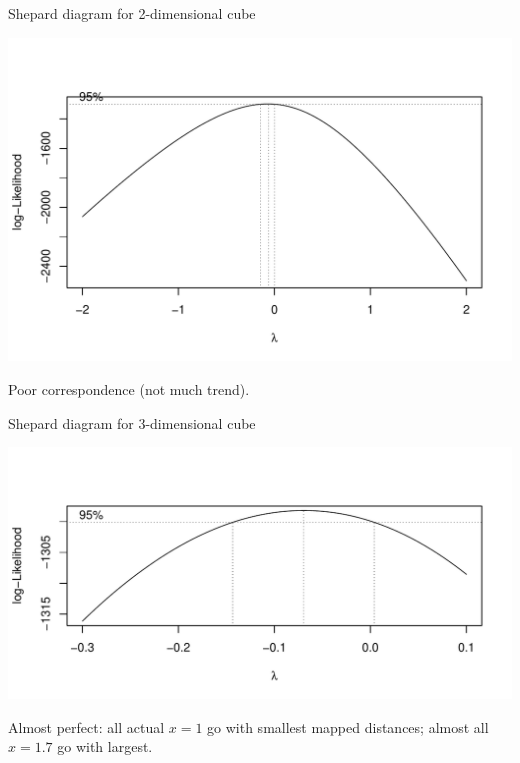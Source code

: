 \begin{frame}[fragile]{Shepard diagram for 2-dimensional cube}

\begin{knitrout}
\color{fgcolor}\begin{kframe}
\begin{alltt}
\end{alltt}
\end{kframe}
\includegraphics[width=\maxwidth]{figure/unnamed-chunk-38-1} 

\end{knitrout}

Poor correspondence (not much trend).
\end{frame}

\begin{frame}[fragile]{Shepard diagram for 3-dimensional cube}
  
\begin{knitrout}
\color{fgcolor}\begin{kframe}
\begin{alltt}
\end{alltt}
\end{kframe}
\includegraphics[width=\maxwidth]{figure/unnamed-chunk-39-1} 

\end{knitrout}
  
Almost perfect: all actual $x=1$ go with smallest mapped distances; almost
all $x=1.7$ go with  largest.
\end{frame}

